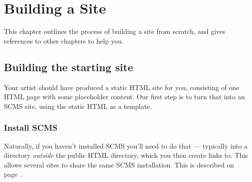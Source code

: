 %
%
%
%
%
%
% 
%
% 
% 
%

\chapter{Building a Site}
This chapter outlines the process of building a site from scratch,
and gives references to other chapters to help you.

\section{Building the starting site}
Your artist should have produced a static HTML site for you, consisting
of one HTML page with some placeholder content. Our first step is to
turn that into an SCMS site, using the static HTML as a template.
\subsection{Install SCMS}
Naturally, if you haven't installed SCMS you'll need to do that --- typically
into a directory \emph{outside} the public HTML directory,
which you then create links to. This allows several sites to share the same
SCMS installation. This is described on page~\pageref{installation}.

